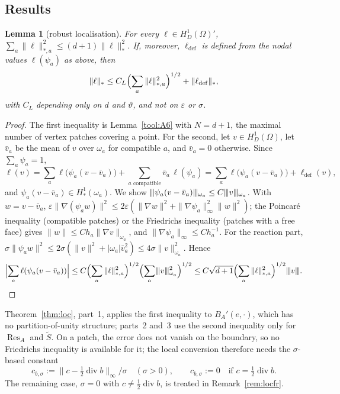 \documentclass[11pt]{article}
\newcommand{\tnorm}[1]{\lvert\kern-0.25ex\lvert\kern-0.25ex\lvert #1\rvert\kern-0.25ex\rvert\kern-0.25ex\rvert}
\newcommand{\eps}{\varepsilon}
\newcommand{\Res}{\operatorname{Res}}
\newcommand{\Stil}{\tilde S}
\newcommand{\dv}{\operatorname{div}}
\newcommand{\defe}{\mathrm{def}}
\theoremstyle{plain}
\newtheorem{lemma}[theorem]{Lemma}
\theoremstyle{remark}
\numberwithin{equation}{section}
\begin{document}
\subsection{Results}

\begin{lemma}[robust localisation]\label{lem:L}
For every $\ell\in H^1_D(\Omega)'$, $\sum_a\|\ell\|_{*,a}^2\le(d+1)\|\ell\|_*^2$. If, moreover,
$\ell_\defe$ is defined from the nodal values $\ell(\psi_a)$ as above, then
\[
  \|\ell\|_*\le C_L\Bigl(\sum_a\|\ell\|_{*,a}^2\Bigr)^{1/2}+\|\ell_\defe\|_*,
\]
with $C_L$ depending only on $d$ and $\vartheta$, and not on $\eps$ or $\sigma$.
\end{lemma}

\begin{proof}
The first inequality is Lemma~\ref{tool:A6} with $N=d+1$, the maximal number of vertex patches
covering a point. For the second, let $v\in H^1_D(\Omega)$, let $\bar v_a$ be the mean of $v$ over
$\omega_a$ for compatible $a$, and $\bar v_a=0$ otherwise. Since $\sum_a\psi_a=1$,
\[
  \ell(v)=\sum_a\ell\bigl(\psi_a(v-\bar v_a)\bigr)+\sum_{a\text{ compatible}}\bar v_a\,\ell(\psi_a)
  =\sum_a\ell\bigl(\psi_a(v-\bar v_a)\bigr)+\ell_\defe(v),
\]
and $\psi_a(v-\bar v_a)\in H^1_*(\omega_a)$. We show
$\tnorm{\psi_a(v-\bar v_a)}_{\omega_a}\le C\tnorm{v}_{\omega_a}$. With $w=v-\bar v_a$,
$\eps\|\nabla(\psi_aw)\|^2\le2\eps(\|\nabla w\|^2+\|\nabla\psi_a\|_\infty^2\|w\|^2)$; the Poincar\'e
inequality (compatible patches) or the Friedrichs inequality (patches with a free face) gives
$\|w\|\le Ch_a\|\nabla v\|_{\omega_a}$, and $\|\nabla\psi_a\|_\infty\le Ch_a^{-1}$. For the reaction
part, $\sigma\|\psi_aw\|^2\le2\sigma(\|v\|^2+|\omega_a|\bar v_a^2)\le4\sigma\|v\|_{\omega_a}^2$. Hence
\[
  \Bigl|\sum_a\ell(\psi_a(v-\bar v_a))\Bigr|\le C\Bigl(\sum_a\|\ell\|_{*,a}^2\Bigr)^{1/2}\Bigl(\sum_a\tnorm{v}_{\omega_a}^2\Bigr)^{1/2}
  \le C\sqrt{d+1}\Bigl(\sum_a\|\ell\|_{*,a}^2\Bigr)^{1/2}\tnorm{v}.\qedhere
\]
\end{proof}

Theorem~\ref{thm:loc}, part~1, applies the first inequality to $B_A'(e,\cdot)$, which has no
partition-of-unity structure; parts~2 and~3 use the second inequality only for $\Res_A$ and $\Stil$.
On a patch, the error does not vanish on the boundary, so no Friedrichs inequality is available for
it; the local conversion therefore needs the $\sigma$-based constant
\[
  c_{b,\sigma}:=\|c-\tfrac12\dv b\|_\infty/\sigma\quad(\sigma>0),\qquad c_{b,\sigma}:=0\quad\text{if }c=\tfrac12\dv b.
\]
The remaining case, $\sigma=0$ with $c\ne\frac12\dv b$, is treated in Remark~\ref{rem:locfr}.
\end{document}
